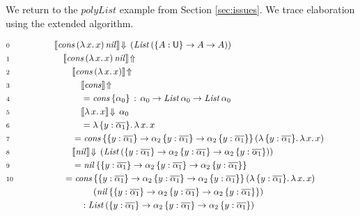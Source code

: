 \documentclass[acmsmall,screen,dvipsnames]{acmart}\settopmatter{}
\renewcommand{\U}{\mathsf{U}}
\newcommand{\mi}[1]{\mathit{#1}}
\newcommand{\echeckt}[2]{\llbracket#1\rrbracket\!\Downarrow\,#2}
\newcommand{\einfert}[1]{\llbracket#1\rrbracket\!\Uparrow}
\newcommand{\ol}[1]{\overline{#1}}
\theoremstyle{remark}
\begin{document}
\begin{example}
We return to the $\mi{polyList}$ example from Section \ref{sec:issues}. We trace
elaboration using the extended algorithm.

\begingroup
\allowdisplaybreaks
\begin{alignat*}{3}
  & \scriptstyle{0 }\qquad\qquad && \echeckt{\mi{cons}\,(\lambda\,x.\,x)\,\mi{nil}}{(\mi{List}\,(\{A : \U\}\to A \to A))}
      \hspace{14em}\\
  & \scriptstyle{1 }  && \quad \einfert{\mi{cons}\,(\lambda\,x.\,x)\,\mi{nil}} \\
  & \scriptstyle{2 }  && \qquad \einfert{\mi{cons}\,(\lambda\,x.\,x)} \\
  & \scriptstyle{3 }  && \qquad\quad \einfert{\mi{cons}}\\
  & \scriptstyle{4 }  && \qquad\quad = \mi{cons}\,\{\alpha_0\}\,:\,\alpha_0 \to \mi{List}\,\alpha_0 \to \mi{List}\,\alpha_0\\
  & \scriptstyle{5 }  && \qquad\quad \echeckt{\lambda\,x.\,x}{\alpha_0}\\
  & \scriptstyle{6 }  && \qquad\quad = \lambda\,\{y : \ol{\alpha_1}\}.\,\lambda\,x.\,x\\
  & \scriptstyle{7 }  && \qquad = \mi{cons}\,
                       \{\{y : \ol{\alpha_1}\} \to \alpha_2\,\{y : \ol{\alpha_1}\}\to \alpha_2\,\{y : \ol{\alpha_1}\}\}\,
                       (\lambda\,\{y : \ol{\alpha_1}\}.\,\lambda\,x.\,x)\\
  & \scriptstyle{8 }  && \qquad \echeckt{\mi{nil}}{(\mi{List}\,(\{y : \ol{\alpha_1}\} \to \alpha_2\,\{y : \ol{\alpha_1}\}\to \alpha_2\,\{y : \ol{\alpha_1}\}))}\\
  & \scriptstyle{9 }  && \qquad = \mi{nil}\,\{\{y : \ol{\alpha_1}\} \to \alpha_2\,\{y : \ol{\alpha_1}\}\to \alpha_2\,\{y : \ol{\alpha_1}\}\}\\
                       & \scriptstyle{10} && \quad = \mi{cons}\,\{\{y : \ol{\alpha_1}\} \to \alpha_2\,\{y : \ol{\alpha_1}\}\to \alpha_2\,\{y : \ol{\alpha_1}\}\}\,(\lambda\,\{y : \ol{\alpha_1}\}.\,\lambda\,x.\,x)\,\\
                       & && \hspace{4.4em} (\mi{nil}\,\{\{y : \ol{\alpha_1}\} \to \alpha_2\,\{y : \ol{\alpha_1}\}\to \alpha_2\,\{y : \ol{\alpha_1}\}\})\\
  & && \hspace{3em} : \mi{List}\,(\{y : \ol{\alpha_1}\} \to \alpha_2\,\{y : \ol{\alpha_1}\}\to \alpha_2\,\{y : \ol{\alpha_1}\})\\

\end{alignat*}
\end{example}
\end{document}
